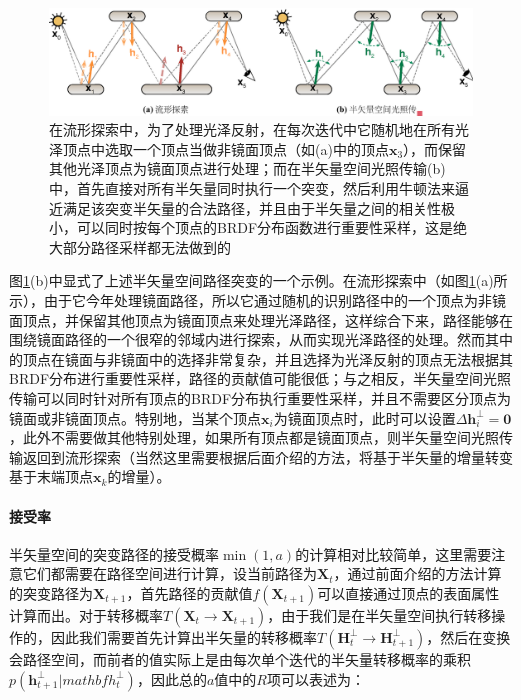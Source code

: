 \begin{figure}
\begin{fullwidth}
	\includegraphics[width=1.0\thewidth]{figures/mlt/me-vs-hslt}
	\caption{在流形探索中，为了处理光泽反射，在每次迭代中它随机地在所有光泽顶点中选取一个顶点当做非镜面顶点（如(a)中的顶点$\mathbf{x}_3$），而保留其他光泽顶点为镜面顶点进行处理；而在半矢量空间光照传输(b)中，首先直接对所有半矢量同时执行一个突变，然后利用牛顿法来逼近满足该突变半矢量的合法路径，并且由于半矢量之间的相关性极小，可以同时按每个顶点的BRDF分布函数进行重要性采样，这是绝大部分路径采样都无法做到的}
	\label{f:mlt-me-vs-hslt}
\end{fullwidth}
\end{figure}

图\ref{f:mlt-me-vs-hslt}(b)中显式了上述半矢量空间路径突变的一个示例。在流形探索中（如图\ref{f:mlt-me-vs-hslt}(a)所示），由于它今年处理镜面路径，所以它通过随机的识别路径中的一个顶点为非镜面顶点，并保留其他顶点为镜面顶点来处理光泽路径，这样综合下来，路径能够在围绕镜面路径的一个很窄的邻域内进行探索，从而实现光泽路径的处理。然而其中的顶点在镜面与非镜面中的选择非常复杂，并且选择为光泽反射的顶点无法根据其BRDF分布进行重要性采样，路径的贡献值可能很低；与之相反，半矢量空间光照传输可以同时针对所有顶点的BRDF分布执行重要性采样，并且不需要区分顶点为镜面或非镜面顶点。特别地，当某个顶点$\mathbf{x}_i$为镜面顶点时，此时可以设置$\Delta\mathbf{h}^{\perp}_i=\mathbf{0}$，此外不需要做其他特别处理，如果所有顶点都是镜面顶点，则半矢量空间光照传输返回到流形探索（当然这里需要根据后面介绍的方法，将基于半矢量的增量转变基于末端顶点$\mathbf{x}_k$的增量）。



\paragraph{接受率}
半矢量空间的突变路径的接受概率$\min(1,a)$的计算相对比较简单，这里需要注意它们都需要在路径空间进行计算，设当前路径为$\mathbf{X}_t$，通过前面介绍的方法计算的突变路径为$\mathbf{X}_{t+1}$，首先路径的贡献值$f(\mathbf{X}_{t+1})$可以直接通过顶点的表面属性计算而出。对于转移概率$T(\mathbf{X}_t\to\mathbf{X}_{t+1})$，由于我们是在半矢量空间执行转移操作的，因此我们需要首先计算出半矢量的转移概率$T(\mathbf{H}^{\perp}_t\to\mathbf{H}^{\perp}_{t+1})$，然后在变换会路径空间，而前者的值实际上是由每次单个迭代的半矢量转移概率的乘积$p(\mathbf{h}^{\perp}_{t+1}|mathbf{h}^{\perp}_t)$，因此总的$a$值中的$R$项可以表述为：

